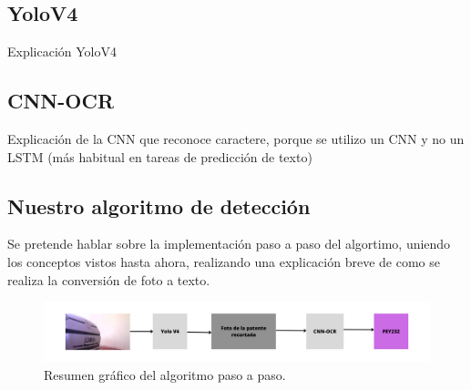 \subsection{YoloV4}

Explicación YoloV4

\subsection{CNN-OCR}

Explicación de la CNN que reconoce caractere, porque se utilizo un CNN y no un LSTM (más habitual en tareas de predicción de texto)


\subsection{Nuestro algoritmo de detección}

Se pretende hablar sobre la implementación paso a paso del algortimo, uniendo los conceptos vistos hasta ahora, realizando una explicación breve de como se realiza la conversión de foto a texto.

\begin{figure}[bth]
    \centering
    \includegraphics{imgs/algoritmo-deteccion-patente.png}
    \caption{Resumen gráfico del algoritmo paso a paso.}
\end{figure}